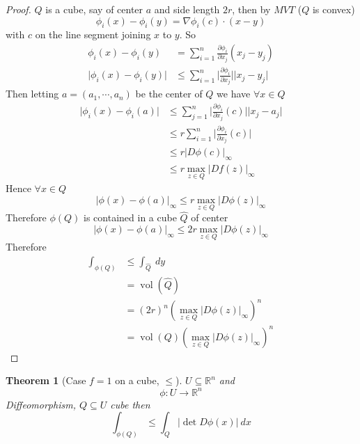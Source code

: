 \documentclass[11pt,a4paper]{article}
\theoremstyle{definition}
\theoremstyle{plain}
\newtheorem{theorem}[definition]{Theorem}
\theoremstyle{remark}
\newcommand{\R}{\mathbb{R}}
\newcommand{\abs}[1]{\lvert #1 \rvert}
\newcommand{\vol}{\operatorname{vol}}
\begin{document}
\begin{proof}
    $Q$ is a cube, say of center $a$ and side length $2r$, then by $MVT$ ($Q$ is convex)
    $$\phi_i(x) - \phi_i(y)  = \nabla \phi_i(c) \cdot (x-y)$$
    with $c$ on the line segment joining $x$ to $y$. So 
    \begin{align*}
        \phi_i(x) - \phi_i(y) &= \sum_{i=1}^n \frac{\partial \phi_i}{\partial x_j} (x_j - y_j) \\
        \abs{\phi_i(x) - \phi_i(y)} &\le \sum_{i=1}^n \abs{\frac{\partial \phi_i}{\partial x_j}}\abs{x_j - y_j} 
    \end{align*}
    Then letting $a = (a_1, \cdots, a_n)$ be the center of $Q$ we have $\forall x \in Q$
    \begin{align*}
        \abs{\phi_i(x) - \phi_i(a)} &\le \sum_{j=1}^n \abs{\frac{\partial \phi_i}{\partial x_j} (c)} \abs{x_j-a_j} \\
        &\le r \sum_{i=1}^n \abs{\frac{\partial \phi_i}{\partial x_j} (c)} \\
        &\le r \abs{D\phi(c)}_\infty \\
        &\le r \max_{z \in Q} \abs{Df(z)}_\infty
    \end{align*}
    Hence $\forall x \in Q$
    $$\abs{\phi(x) - \phi(a)}_\infty \le r \max_{z \in Q} \abs{D\phi(z)}_\infty $$
    Therefore $\phi(Q)$ is contained in a cube $\hat{Q}$ of center 
    $$\abs{\phi(x) - \phi(a)}_\infty \le 2 r \max_{z \in Q} \abs{D\phi(z)}_\infty$$
    Therefore 
    \begin{align*}
        \int_{\phi(Q)} &\le \int_{\hat{Q}} \ dy \\
        &= \vol (\hat{Q}) \\
        &= (2r)^n (\max_{z \in Q} \abs{D\phi(z)}_\infty)^n \\
        &= \vol (Q) (\max_{z \in Q} \abs{D\phi(z)}_\infty)^n 
    \end{align*}
\end{proof} 

\begin{theorem}[Case $f = 1$ on a cube, $\le$]
    $U \subseteq \R^n$ and 
    $$\phi \colon U \to \R^n$$ 
    Diffeomorphism, $Q \subseteq U$ cube then 
    $$\int_{\phi(Q)} \le \int_Q \abs{\det D\phi(x)} \ dx$$
\end{theorem}
\end{document}
